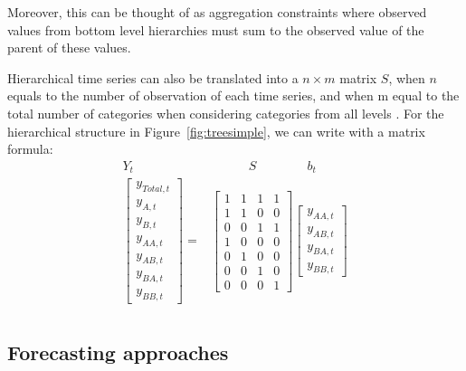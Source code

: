 Moreover, this can be thought of as aggregation constraints where observed values from bottom level hierarchies must sum to the observed value of the parent of these values. 


\newpara

Hierarchical time series can also be translated into a $n \times m$ matrix $S$, when $n$ equals to the number of observation of each time series, and when m equal to the total number of categories when considering categories from all levels \citep{Hydnman2016,wickramasuriya2019optimal}. For the hierarchical structure in Figure~\ref{fig:treesimple}, we can write with a matrix formula:
\begin{equation}\label{equ:Ts4}
\begin{aligned}
Y_t  \quad & \quad \quad \quad S \quad \quad \quad \quad b_t \\
\begin{bmatrix}
y_{Total,t} \\
y_{A,t}\\
y_{B,t} \\
y_{AA,t} \\
y_{AB,t}\\
y_{BA,t} \\
y_{BB,t}
\end{bmatrix}
= &
\begin{bmatrix}
1 & 1 & 1 & 1 \\
1 & 1 & 0 & 0 \\
0 & 0 & 1 & 1 \\
1  & 0  & 0  & 0  \\
0  & 1  & 0  & 0  \\
0  & 0  & 1  & 0  \\
0  & 0  & 0  & 1
\end{bmatrix}
\begin{bmatrix}
y_{AA,t} \\
y_{AB,t} \\
y_{BA,t} \\
y_{BB,t}
\end{bmatrix}\\
\end{aligned}
\end{equation}

\subsection{Forecasting approaches}

